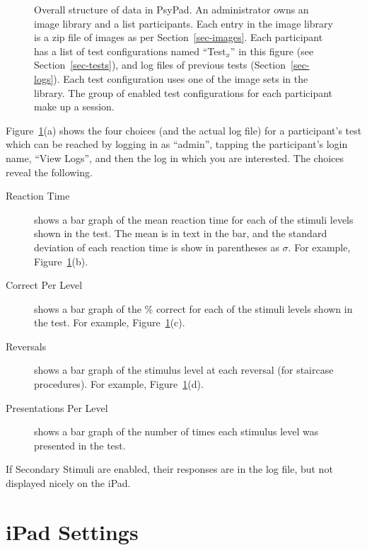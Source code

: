 \documentclass{article}
\begin{document}
\begin{figure}
\begin{center}
\caption{\label{fig-anal}Overall structure of data in PsyPad.
An administrator owns an image library and a list participants.
Each entry in the image library is a zip file of images as per
Section~\ref{sec-images}. Each participant has a list of test
configurations named ``Test$_x$'' in this figure (see Section~\ref{sec-tests}), 
and log files of
previous tests (Section~\ref{sec-logs}). 
Each test configuration uses one of the image sets in
the library. 
The group of enabled test configurations for each
participant make up a session.}

\end{center}
\end{figure}

Figure~\ref{fig-anal}(a) shows the four choices (and the actual log
file) for a participant's test which can be reached by logging in
as ``admin'', tapping the participant's login name, ``View Logs'',
and then the log in which you are interested.
The choices reveal the following.
\begin{description}

\item[Reaction Time] shows a bar graph of the mean reaction time for 
each of the stimuli levels shown in the test. The mean is in text in the bar, and the 
standard deviation of each reaction time is show in parentheses as $\sigma$.
For example, Figure~\ref{fig-anal}(b).


\item[Correct Per Level] shows a bar graph of the \% correct for 
each of the stimuli levels shown in the test. 
For example, Figure~\ref{fig-anal}(c).

\item[Reversals] shows a bar graph of the stimulus level at each reversal (for staircase procedures).
For example, Figure~\ref{fig-anal}(d).

\item[Presentations Per Level] shows a bar graph of the number of times each 
stimulus level was presented in the test.

\end{description}

If Secondary Stimuli are enabled, their responses are in the log file, but not
displayed nicely on the iPad.


\section{iPad Settings}
\label{sec-ipad}
\end{document}
